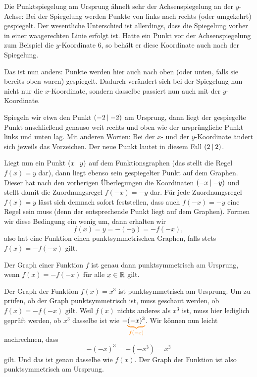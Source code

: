 \documentclass[../../main.tex]{subfiles}
\begin{document}
Die Punktspiegelung am Ursprung ähnelt sehr der Achsenspiegelung an der $y$-Achse: Bei der Spiegelung werden Punkte von links nach rechts (oder umgekehrt) gespiegelt. Der wesentliche Unterschied ist allerdings, dass die Spiegelung vorher in einer waagerechten Linie erfolgt ist. Hatte ein Punkt vor der Achsenspiegelung zum Beispiel die $y$-Koordinate $6$, so behält er diese Koordinate auch nach der Spiegelung.

Das ist nun anders: Punkte werden hier auch nach oben (oder unten, falls sie bereits oben waren) gespiegelt. Dadurch verändert sich bei der Spiegelung nun nicht nur die $x$-Koordinate, sondern dasselbe passiert nun auch mit der $y$-Koordinate.

Spiegeln wir etwa den Punkt $\left(-2 \:\middle|\: -2\right)$ am Ursprung, dann liegt der gespiegelte Punkt anschließend genauso weit rechts und oben wie der ursprüngliche Punkt links und unten lag. Mit anderen Worten: Bei der $x$- und der $y$-Koordinate ändert sich jeweils das Vorzeichen. Der neue Punkt lautet in diesem Fall $\left(2 \:\middle|\: 2\right)$.

Liegt nun ein Punkt $\left(x \:\middle|\: y\right)$ auf dem Funktionsgraphen (das stellt die Regel $f(x)=y$ dar), dann liegt ebenso sein gespiegelter Punkt auf dem Graphen. Dieser hat nach den vorherigen Überlegungen die Koordinaten $\left(-x \:\middle|\: -y\right)$ und stellt damit die Zuordnungsregel $f(-x)=-y$ dar. Für jede Zuordnungsregel $f(x)=y$ lässt sich demnach sofort feststellen, dass auch $f(-x)=-y$ eine Regel sein muss (denn der entsprechende Punkt liegt auf dem Graphen). Formen wir diese Bedingung ein wenig um, dann erhalten wir \[f(x)=y=-(-y)=-f(-x),\]
also hat eine Funktion einen punktsymmetrischen Graphen, falls stets $f(x)=-f(-x)$ gilt.

\begin{theorem}{}
    Der Graph einer Funktion $f$ ist genau dann punktsymmetrisch am Ursprung, wenn $f(x)=-f(-x)$ für alle $x\in\mathbb{R}$ gilt.
\end{theorem}

\begin{example}{}
    Der Graph der Funktion $f(x)=x^3$ ist punktsymmetrisch am Ursprung. Um zu prüfen, ob der Graph punktsymmetrisch ist, muss geschaut werden, ob \mbox{$f(x)=-f(-x)$} gilt. Weil $f(x)$ nichts anderes als $x^3$ ist, muss hier lediglich geprüft werden, ob $x^3$ dasselbe ist wie $-\colorbrace{(-x)^3}{f(-x)}$. Wir können nun leicht nachrechnen, dass
    \[-(-x)^3=-(-x^3)=x^3\]
    gilt. Und das ist genau dasselbe wie $f(x)$. Der Graph der Funktion ist also punktsymmetrisch am Ursprung.
\end{example}
\end{document}
